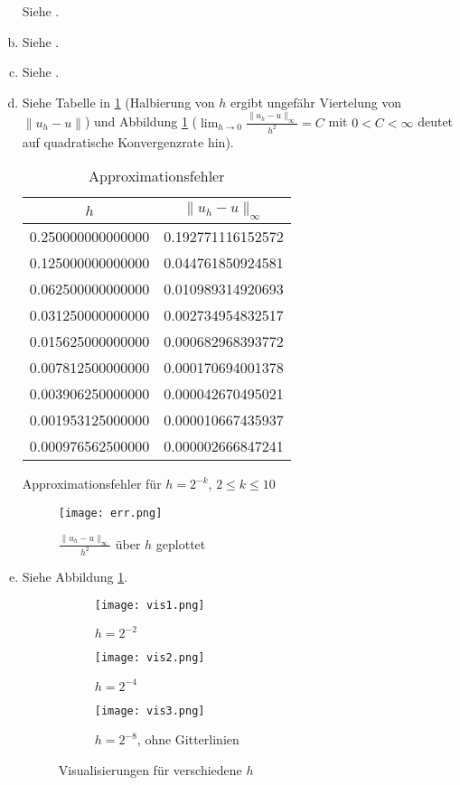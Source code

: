 \documentclass{myexercise}
\begin{document}
\begin{exercise}[Programmieraufgabe]
\begin{enumerate}[a)]
      Siehe .
    \item
      Siehe .
    \item
      Siehe .
    \item
      Siehe Tabelle in \ref{fig:err} (Halbierung von $h$ ergibt ungefähr Viertelung von $\|u_h - u\|$) und Abbildung \ref{fig:err} ($\lim_{h\to 0} \frac{\|u_h - u\|_\infty}{h^2} = C$ mit $0 < C < \infty$ deutet auf quadratische Konvergenzrate hin).
      \begin{table}[ht]
        \begin{subtable}[c]{0.5\textwidth}
          \centering
          \begin{tabular}{cc}
            $h$ & $\|u_h - u\|_\infty$ \\ \hline
     0.250000000000000 & 0.192771116152572 \\
     0.125000000000000 & 0.044761850924581 \\
     0.062500000000000 & 0.010989314920693 \\
     0.031250000000000 & 0.002734954832517 \\
     0.015625000000000 & 0.000682968393772 \\
     0.007812500000000 & 0.000170694001378 \\
     0.003906250000000 & 0.000042670495021 \\
     0.001953125000000 & 0.000010667435937 \\
     0.000976562500000 & 0.000002666847241
          \end{tabular}
          \caption{Approximationsfehler für $h = 2^{-k}$, $2 \le k \le 10$}
        \end{subtable}
        \begin{subfigure}[c]{0.5\textwidth}
	   \texttt{[image: err.png]}
          \caption{$\frac{\|u_h - u\|_\infty}{h^2}$ über $h$ geplottet}
        \end{subfigure}
        \caption{Approximationsfehler}
        \label{fig:err}
      \end{table}
    \item
      Siehe Abbildung \ref{fig:vis}.
      \begin{figure}[ht]
        \begin{subfigure}[t]{0.5\textwidth}
	   \texttt{[image: vis1.png]}
	   \caption{$h = 2^{-2}$}
        \end{subfigure}
        \begin{subfigure}[t]{0.5\textwidth}
	   \texttt{[image: vis2.png]}
	   \caption{$h = 2^{-4}$}
        \end{subfigure}
        \begin{subfigure}[t]{0.5\textwidth}
	   \texttt{[image: vis3.png]}
	   \caption{$h = 2^{-8}$, ohne Gitterlinien}
        \end{subfigure}
	\caption{Visualisierungen für verschiedene $h$}
        \label{fig:vis}
      \end{figure}
  \end{enumerate}
\end{exercise}
\end{document}
